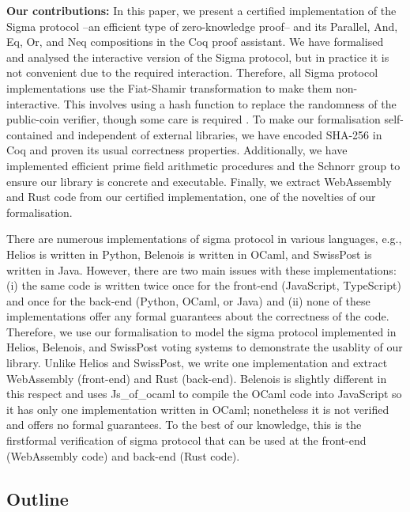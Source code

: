 \documentclass[conference,compsoc]{IEEEtran}
\begin{document}
\textbf{Our contributions:}
In this paper, we present a certified implementation of the Sigma protocol --an efficient 
type of zero-knowledge proof-- and its Parallel, And, Eq, Or, and Neq compositions in 
the Coq proof assistant. We have formalised and analysed the interactive version of 
the Sigma protocol, but in practice it is not convenient due to the required interaction. 
Therefore, all Sigma protocol implementations use the Fiat-Shamir 
transformation \cite{10.5555/36664.36676} to make them non-interactive. This involves 
using a hash function to replace the randomness of the public-coin verifier, though 
some care is required \cite{10.1007/978-3-642-34961-4_38}.
To make our formalisation self-contained and independent of external libraries, we have 
encoded SHA-256 in Coq and proven its usual correctness properties. Additionally, we 
have implemented efficient prime field arithmetic procedures and the Schnorr group to 
ensure our library is concrete and executable. Finally, we extract WebAssembly and 
Rust code from our certified implementation, one of the novelties of our 
formalisation.


There are numerous implementations of sigma protocol in various languages, 
e.g., Helios is written in Python, Belenois is written in OCaml, and SwissPost is written in Java.
However, there are two main issues with these implementations: 
(i) the same code is written twice 
once for the front-end (JavaScript, TypeScript) and once for the back-end (Python, OCaml, or Java) and 
(ii) none of these implementations offer any formal guarantees about the correctness of the code.
Therefore, we use our formalisation to model the sigma protocol implemented in Helios, 
Belenois, and SwissPost voting systems to demonstrate the usablity of 
our library. Unlike Helios and SwissPost,
we write one implementation and extract WebAssembly (front-end) and Rust (back-end). 
Belenois is slightly different in this respect and uses Js\_of\_ocaml 
to compile the OCaml code into JavaScript so it has only one 
implementation written in OCaml; nonetheless it is not verified 
and offers no formal guarantees. To the best of our knowledge, 
this is the firstformal verification of sigma protocol that can be used at 
the front-end (WebAssembly code) and back-end (Rust code). 

\subsection{Outline}
\end{document}
